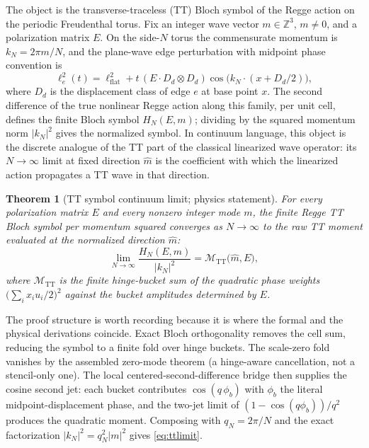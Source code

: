 \documentclass[11pt,letterpaper]{article}
\newtheorem{theorem}{Theorem}[section]
\begin{document}
The object is the transverse-traceless (TT) Bloch symbol of the Regge action on the periodic Freudenthal torus. Fix an integer wave vector $m\in\mathbb{Z}^{3}$, $m\neq 0$, and a polarization matrix $E$. On the side-$N$ torus the commensurate momentum is $k_{N}=2\pi m/N$, and the plane-wave edge perturbation with midpoint phase convention is
\begin{equation}
\ell^{2}_{e}(t)=\ell^{2}_{\mathrm{flat}}+t\,(E\cdot D_{d}\otimes D_{d})\cos\!\bigl(k_{N}\cdot(x+D_{d}/2)\bigr),
\label{eq:planewave}
\end{equation}
where $D_{d}$ is the displacement class of edge $e$ at base point $x$. The second difference of the true nonlinear Regge action along this family, per unit cell, defines the finite Bloch symbol $H_{N}(E,m)$; dividing by the squared momentum norm $|k_{N}|^{2}$ gives the normalized symbol. In continuum language, this object is the discrete analogue of the TT part of the classical linearized wave operator: its $N\to\infty$ limit at fixed direction $\hat{m}$ is the coefficient with which the linearized action propagates a TT wave in that direction.

\begin{theorem}[TT symbol continuum limit; physics statement]
\label{thm:continuum}
For every polarization matrix $E$ and every nonzero integer mode $m$, the finite Regge TT Bloch symbol per momentum squared converges as $N\to\infty$ to the raw TT moment evaluated at the normalized direction $\hat{m}$:
\begin{equation}
\lim_{N\to\infty}\frac{H_{N}(E,m)}{|k_{N}|^{2}}
=\mathcal{M}_{\mathrm{TT}}\bigl(\hat{m},E\bigr),
\label{eq:ttlimit}
\end{equation}
where $\mathcal{M}_{\mathrm{TT}}$ is the finite hinge-bucket sum of the quadratic phase weights $\bigl(\sum_{i}x_{i}u_{i}/2\bigr)^{2}$ against the bucket amplitudes determined by $E$.
\end{theorem}

The proof structure is worth recording because it is where the formal and the physical derivations coincide. Exact Bloch orthogonality removes the cell sum, reducing the symbol to a finite fold over hinge buckets. The scale-zero fold vanishes by the assembled zero-mode theorem (a hinge-aware cancellation, not a stencil-only one). The local centered-second-difference bridge then supplies the cosine second jet: each bucket contributes $\cos(q\,\phi_{b})$ with $\phi_{b}$ the literal midpoint-displacement phase, and the two-jet limit of $(1-\cos(q\phi_{b}))/q^{2}$ produces the quadratic moment. Composing with $q_{N}=2\pi/N$ and the exact factorization $|k_{N}|^{2}=q_{N}^{2}|m|^{2}$ gives \eqref{eq:ttlimit}.
\end{document}
